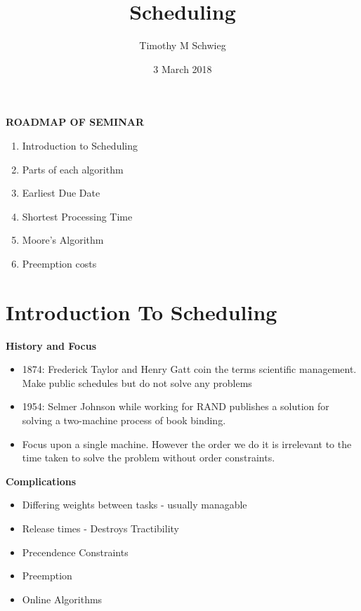 \documentclass[grey,handout]{beamer}
\renewcommand{\frametitle}[1]{\begin{center}\textbf{#1}\end{center}}
\begin{document}
\title{Scheduling}

\author{Timothy M Schwieg}
\date{3 March 2018}

\begin{frame}
  \titlepage
\end{frame}

\begin{frame}
\frametitle{ROADMAP OF SEMINAR}
  \begin{enumerate}[<+->]
  \item Introduction to Scheduling
  \item Parts of each algorithm
  \item Earliest Due Date
  \item Shortest Processing Time
  \item Moore's Algorithm
  \item Preemption costs
  \end{enumerate}
\end{frame}

\section{Introduction To Scheduling}

\begin{frame}
  \frametitle{History and Focus}
  \begin{itemize}[<+->]
  \item 1874: Frederick Taylor and Henry Gatt coin the terms scientific
    management. Make public schedules but do not solve any problems
  \item 1954: Selmer Johnson while working for RAND publishes a
    solution for solving a two-machine process of book binding.
  \item Focus upon a single machine. However the order we do it is
    irrelevant to the time taken to solve the problem without order constraints.
  \end{itemize}
\end{frame}



\begin{frame}
  \frametitle{Complications}
  \begin{itemize}
  \item Differing weights between tasks - usually managable
  \item Release times - Destroys Tractibility
  \item Precendence Constraints
  \item Preemption
  \item Online Algorithms
  \end{itemize}
\end{frame}
\end{document}
